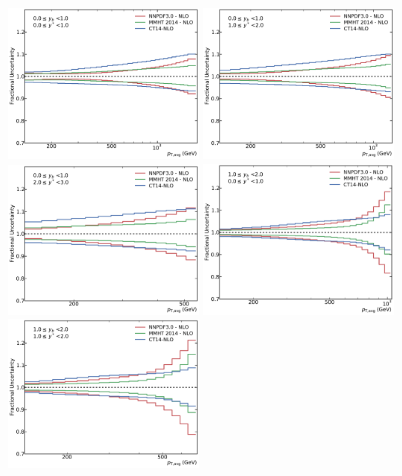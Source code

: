 \begin{figure}[htp]
    \centering
    \includegraphics[width=0.45\textwidth]{figures/theory/pdf_unc_comparison_yb0ys0.pdf}\hfill
    \includegraphics[width=0.45\textwidth]{figures/theory/pdf_unc_comparison_yb0ys1.pdf}
    \includegraphics[width=0.45\textwidth]{figures/theory/pdf_unc_comparison_yb0ys2.pdf}\hfill
    \includegraphics[width=0.45\textwidth]{figures/theory/pdf_unc_comparison_yb1ys0.pdf}
    \includegraphics[width=0.45\textwidth]{figures/theory/pdf_unc_comparison_yb1ys1.pdf}\hfill

\end{figure}
